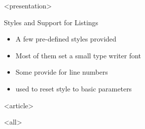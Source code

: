 \mode
<presentation>

\begin{frame}{Styles and Support for Listings}
  \label{manual:listing}

  \begin{itemize}
    \item A few pre-defined styles provided
    \item Most of them set a small type writer font
    \item Some provide for line numbers
    \item \cmd{\lstdefinestyle} used to reset style to basic parameters
  \end{itemize}

  \begin{example}[use within normal text]
    }
  \end{example}

  \begin{example}[use for beamer frames]
    }
  \end{example}

\end{frame}


\mode
<article>

\bigskip


\clearpage

\mode
<all>
